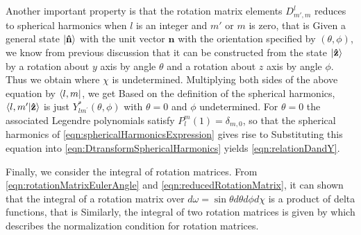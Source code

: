 Another important property  is that the 
rotation matrix elements  $D^{l}_{m', m}$ reduces to spherical harmonics when $l$ is an integer and $m'$ or $m$ is zero\cite{zare-book}, that is
Given a general state $|  \mathbf{\hat{n} }  \rangle$ with the unit vector 
$\mathbf{\hat{n}}$ with the orientation specified by $(\theta, \phi)$, we know from previous discussion that  it can be constructed 
from the state $| \mathbf{\hat{z}} \rangle$ by a rotation about $y$ axis by angle $\theta$ and a rotation about $z$ axis by
angle $\phi$. Thus we obtain
where $\chi$ is undetermined. Multiplying both sides of the above equation by $\langle l, m |$, we get 
Based on the definition of the spherical harmonics, $\langle l, m^{\prime}  | \mathbf{\hat{z}} \rangle$ is just 
$Y_{lm^{\prime}}^{*}(\theta, \phi)$ with $\theta = 0$ and $\phi$ undetermined. 
For $\theta=0$ the associated Legendre polynomials satisfy $P_{l}^{m}(1) =\delta_{m, 0}$, so that the spherical harmonics of \autoref{eqn:sphericalHarmonicsExpression} gives rise to 
Substituting this equation into \autoref{eqn:DtransformSphericalHarmonics} yields \autoref{eqn:relationDandY}. 

Finally, we consider the integral of rotation matrices. From \autoref{eqn:rotationMatrixEulerAngle} and 
\autoref{eqn:reducedRotationMatrix}, it can shown that the integral of a rotation matrix over $d\omega = \sin\theta d\theta d\phi  d\chi$ is a
product of delta functions\cite{RotSpect}, that is
Similarly, the integral of two rotation matrices is given by\cite{zare-book}
which describes the normalization condition for rotation matrices. 

